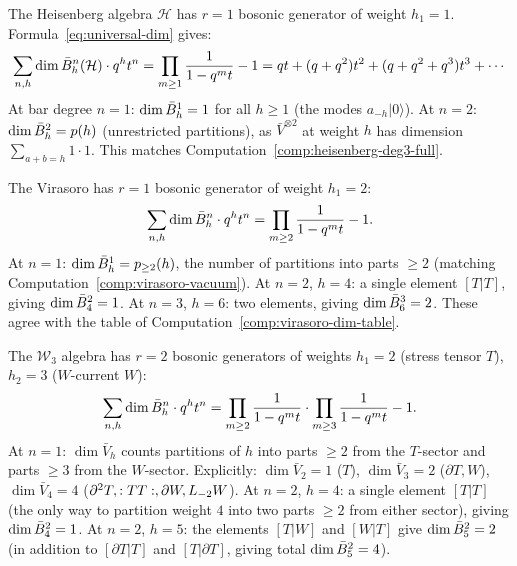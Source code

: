 \begin{computation}\label{comp:verify-heisenberg}
The Heisenberg algebra $\mathcal{H}$ has $r = 1$ bosonic generator
of weight $h_1 = 1$.  Formula~\eqref{eq:universal-dim} gives:
\[
\sum_{n,h} \dim \bar{B}^n_h(\mathcal{H}) \cdot q^h t^n
= \prod_{m \geq 1} \frac{1}{1 - q^m t} - 1
= qt + (q + q^2)t^2 + (q + q^2 + q^3)t^3 + \cdots
\]
At bar degree $n = 1$: $\dim \bar{B}^1_h = 1$ for all $h \geq 1$
(the modes $a_{-h}|0\rangle$).  At $n = 2$: $\dim \bar{B}^2_h = p(h)$
(unrestricted partitions), as $\bar{V}^{\otimes 2}$ at weight $h$
has dimension $\sum_{a+b=h} 1 \cdot 1$.
This matches
Computation~\ref{comp:heisenberg-deg3-full}.
\end{computation}

\begin{computation}\label{comp:verify-virasoro}
The Virasoro has $r = 1$ bosonic generator of weight $h_1 = 2$:
\[
\sum_{n,h} \dim \bar{B}^n_h \cdot q^h t^n
= \prod_{m \geq 2} \frac{1}{1 - q^m t} - 1.
\]
At $n = 1$:
$\dim \bar{B}^1_h = p_{\geq 2}(h)$, the number of partitions into parts
$\geq 2$ (matching Computation~\ref{comp:virasoro-vacuum}).
At $n = 2$, $h = 4$: a single element $[T|T]$,
giving $\dim \bar{B}^2_4 = 1$.
At $n = 3$, $h = 6$: two elements, giving $\dim \bar{B}^3_6 = 2$.
These agree with the table of Computation~\ref{comp:virasoro-dim-table}.
\end{computation}

\begin{computation}\label{comp:verify-w3}
The $\mathcal{W}_3$ algebra has $r = 2$ bosonic generators of weights
$h_1 = 2$ (stress tensor $T$), $h_2 = 3$ ($W$-current $W$):
\[
\sum_{n,h} \dim \bar{B}^n_h \cdot q^h t^n
= \prod_{m \geq 2} \frac{1}{1 - q^m t}
  \cdot \prod_{m \geq 3} \frac{1}{1 - q^m t} - 1.
\]
At $n = 1$: $\dim \bar{V}_h$ counts partitions of $h$ into parts
$\geq 2$ from the $T$-sector and parts $\geq 3$ from the $W$-sector.
Explicitly: $\dim \bar{V}_2 = 1$ ($T$), $\dim \bar{V}_3 = 2$
($\partial T, W$), $\dim \bar{V}_4 = 4$
($\partial^2 T, :{TT}:, \partial W, L_{-2}W$).
At $n = 2$, $h = 4$: a single element $[T|T]$ (the only way to
partition weight $4$ into two parts $\geq 2$ from either sector),
giving $\dim \bar{B}^2_4 = 1$.
At $n = 2$, $h = 5$: the elements $[T|W]$ and $[W|T]$ give
$\dim \bar{B}^2_5 = 2$ (in addition to $[\partial T | T]$ and $[T|\partial T]$,
giving total $\dim \bar{B}^2_5 = 4$).
\end{computation}

